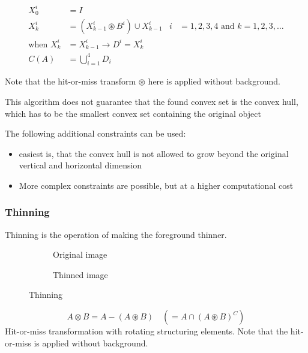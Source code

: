 \begin{align*}
	X_0^i &= I \\
	X_k^i &= (X_{k-1}^i \circledast B^i) \cup X_{k-1}^i & i &=1,2,3,4 \text{ and } k=1,2,3,\ldots \\
	\text{when } X_k^i &= X_{k-1}^i \longrightarrow D^i = X_k^i \\
	C(A) &= \bigcup\limits_{i=1}^4 D_i
\end{align*}

Note that the hit-or-miss transform $\circledast$ here is applied without background.

This algorithm does not guarantee that the found convex set is the convex hull, which has to be the smallest convex set containing the original object

The following additional constraints can be used:
\begin{itemize}
\item easiest is, that the convex hull is not allowed to grow beyond the original vertical and horizontal dimension
\item More complex constraints are possible, but at a higher computational cost
\end{itemize}

\subsubsection{Thinning}
Thinning is the operation of making the foreground thinner.
\begin{figure}[h]
	\centering
	\begin{subfigure}[b]{0.45\textwidth}
		\centering
		\caption{Original image}
	\end{subfigure}
	\begin{subfigure}[b]{0.45\textwidth}
		\centering
		\caption{Thinned image}
	\end{subfigure}
	\caption{Thinning}
\end{figure}
	\[
		A \otimes  B = A - (A \circledast B) \quad(= A \cap (A \circledast B)^C)
	\]
Hit-or-miss transformation with rotating structuring elements. Note that the hit-or-miss is applied without background. \\

